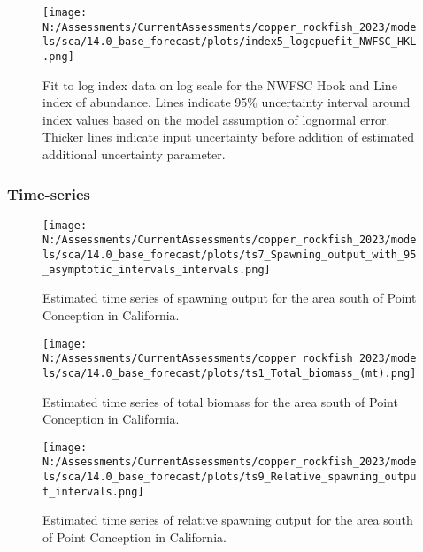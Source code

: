 \documentclass[11pt,
  english,
  letterpaper,
]{article}
\begin{document}
\pagebreak

\begin{figure}
\centering
\texttt{[image: N:/Assessments/CurrentAssessments/copper\_rockfish\_2023/models/sca/14.0\_base\_forecast/plots/index5\_logcpuefit\_NWFSC\_HKL.png]}
\caption{Fit to log index data on log scale for the NWFSC Hook and Line index of abundance. Lines indicate 95\% uncertainty interval around index values based on the model assumption of lognormal error. Thicker lines indicate input uncertainty before addition of estimated additional uncertainty parameter.\label{fig:nwfsc-hkl-index-fit}}
\end{figure}

\pagebreak

\hypertarget{time-series}{%
\subsubsection{Time-series}\label{time-series}}

\begin{figure}
\centering
\texttt{[image: N:/Assessments/CurrentAssessments/copper\_rockfish\_2023/models/sca/14.0\_base\_forecast/plots/ts7\_Spawning\_output\_with\_95\_asymptotic\_intervals\_intervals.png]}
\caption{Estimated time series of spawning output for the area south of Point Conception in California.\label{fig:ssb}}
\end{figure}

\pagebreak

\begin{figure}
\centering
\texttt{[image: N:/Assessments/CurrentAssessments/copper\_rockfish\_2023/models/sca/14.0\_base\_forecast/plots/ts1\_Total\_biomass\_(mt).png]}
\caption{Estimated time series of total biomass for the area south of Point Conception in California.\label{fig:tot-bio}}
\end{figure}

\pagebreak

\begin{figure}
\centering
\texttt{[image: N:/Assessments/CurrentAssessments/copper\_rockfish\_2023/models/sca/14.0\_base\_forecast/plots/ts9\_Relative\_spawning\_output\_intervals.png]}
\caption{Estimated time series of relative spawning output for the area south of Point Conception in California.\label{fig:depl}}
\end{figure}

\pagebreak
\end{document}
